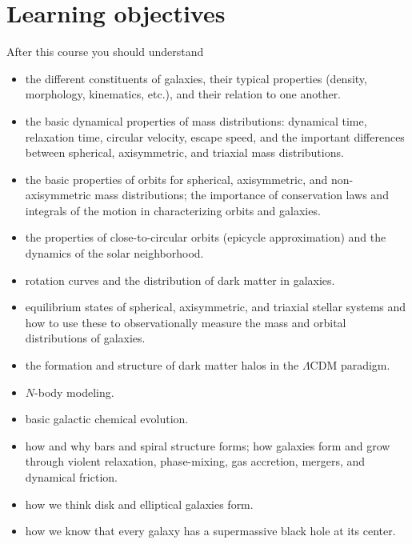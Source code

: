 \documentclass{article}
\begin{document}
\section*{Learning objectives}

After this course you should understand

\begin{itemize}

  \item the different constituents of galaxies, their typical
    properties (density, morphology, kinematics, etc.), and their
    relation to one another.

  \item the basic dynamical properties of mass distributions:
    dynamical time, relaxation time, circular velocity, escape speed,
    and the important differences between spherical, axisymmetric, and
    triaxial mass distributions.

  \item the basic properties of orbits for spherical, axisymmetric,
    and non-axisymmetric mass distributions; the importance of
    conservation laws and integrals of the motion in characterizing
    orbits and galaxies.

  \item the properties of close-to-circular orbits (epicycle
    approximation) and the dynamics of the solar neighborhood.

  \item rotation curves and the distribution of dark matter in
    galaxies.

  \item equilibrium states of spherical, axisymmetric, and triaxial
    stellar systems and how to use these to observationally measure
    the mass and orbital distributions of galaxies.

  \item the formation and structure of dark matter halos in the
    $\Lambda$CDM paradigm.

  \item $N$-body modeling.

  \item basic galactic chemical evolution.

  \item how and why bars and spiral structure forms; how galaxies form
    and grow through violent relaxation, phase-mixing, gas accretion,
    mergers, and dynamical friction.

  \item how we think disk and elliptical galaxies form.

  \item how we know that every galaxy has a supermassive black hole at
    its center.

\end{itemize}
\end{document}
